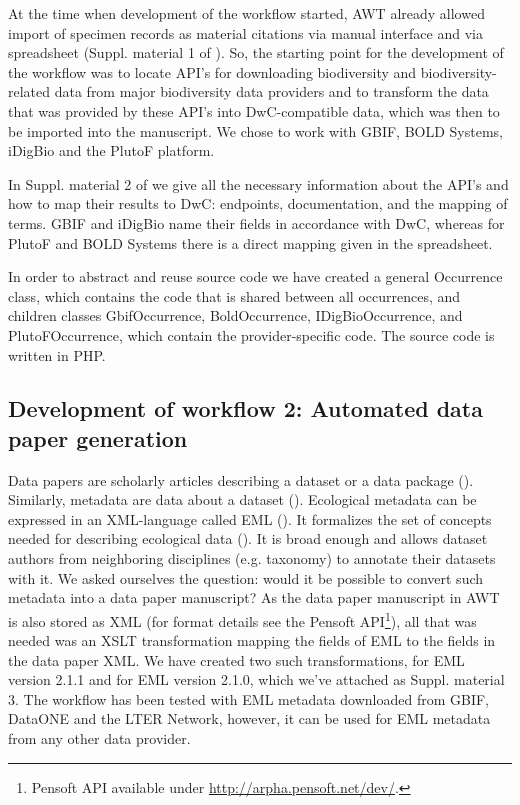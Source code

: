 At the time when development of the workflow started, AWT already allowed import of specimen records as material citations via manual interface and via spreadsheet (Suppl. material 1 of \cite{senderov_online_2016}). So, the starting point for the development of the workflow was to locate API's for downloading biodiversity and biodiversity-related data from major biodiversity data providers and to transform the data that was provided by these API's into DwC-compatible data, which was then to be imported into the manuscript. We chose to work with GBIF, BOLD Systems, iDigBio and the PlutoF platform.

In Suppl. material 2 of \cite{senderov_online_2016} we give all the necessary information about the API's and how to map their results to DwC: endpoints, documentation, and the mapping of terms. GBIF and iDigBio name their fields in accordance with DwC, whereas for PlutoF and BOLD Systems there is a direct mapping given in the spreadsheet.

In order to abstract and reuse source code we have created a general Occurrence class, which contains the code that is shared between all occurrences, and children classes GbifOccurrence, BoldOccurrence, IDigBioOccurrence, and PlutoFOccurrence, which contain the provider-specific code. The source code is written in PHP.

\subsection{Development of workflow 2: Automated data paper generation}

Data papers are scholarly articles describing a dataset or a data package (\cite{chavan_data_2011}). Similarly, metadata are data about a dataset (\cite{michener_meta-information_2006}). Ecological metadata can be expressed in an XML-language called EML (\cite{fegraus_maximizing_2005}). It formalizes the set of concepts needed for describing ecological data (\cite{fegraus_maximizing_2005}). It is broad enough and allows dataset authors from neighboring disciplines (e.g. taxonomy) to annotate their datasets with it. We asked ourselves the question: would it be possible to convert such metadata into a data paper manuscript? As the data paper manuscript in AWT is also stored as XML (for format details see the Pensoft API\footnote{Pensoft API available under \url{http://arpha.pensoft.net/dev/}.}), all that was needed was an XSLT transformation mapping the fields of EML to the fields in the data paper XML. We have created two such transformations, for EML version 2.1.1 and for EML version 2.1.0, which we've attached as Suppl. material 3. The workflow has been tested with EML metadata downloaded from GBIF, DataONE and the LTER Network, however, it can be used for EML metadata from any other data provider.

